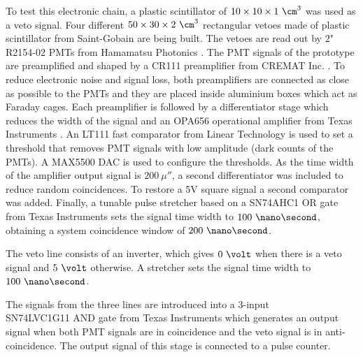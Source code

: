 \begin{enumerate}
To test this electronic chain, a plastic scintillator of $10 \times 10 \times 1~\cm^3$ was used as a veto signal. Four different $50\times 30 \times 2~\cm^3$  rectangular vetoes made of plastic scintillator from Saint-Gobain \cite{VetoAveiro} are being built. The vetoes are read out by $2$" R2154-02 PMTs from Hamamatsu Photonics \cite{DataSheetPMTsAveiro}. The PMT signals of the prototype are preamplified and shaped by a CR111 preamplifier from CREMAT Inc. \cite{CREMATPreAmplifierDataSheet}. To reduce electronic noise and signal loss, both preamplifiers are connected as close as possible to the PMTs and they are placed inside aluminium boxes which act as Faraday cages. Each preamplifier is followed by a differentiator stage which reduces the width of the signal and an OPA656 operational amplifier from Texas Instruments \cite{OPA656}. An LT111 fast comparator from Linear Technology \cite{LT111} is used to set a threshold that removes PMT signals with low amplitude (dark counts of the PMTs). A MAX5500 DAC is used to configure the thresholds. As the time width of the amplifier output signal is $200~\mu\second$, a second differentiator was included to reduce random coincidences. To restore a 5V square signal a second comparator was added. Finally, a tunable pulse stretcher based on a SN74AHC1 OR gate from Texas Instruments \cite{Stretcher} sets the signal time width to $100~\nano\second$, obtaining a system coincidence window of $200~\nano\second$.

The veto line consists of an inverter, which gives $0~\volt$ when there is a veto signal and $5~\volt$ otherwise. A stretcher sets the signal time width to $100~\nano\second$.

The signals from the three lines are introduced into a 3-input \\ SN74LVC1G11 AND gate from Texas Instruments \cite{ANDGate} which generates an output signal when both PMT signals are in coincidence and the veto signal is in anti-coincidence. The output signal of this stage is connected to a pulse counter. 


\end{enumerate}
